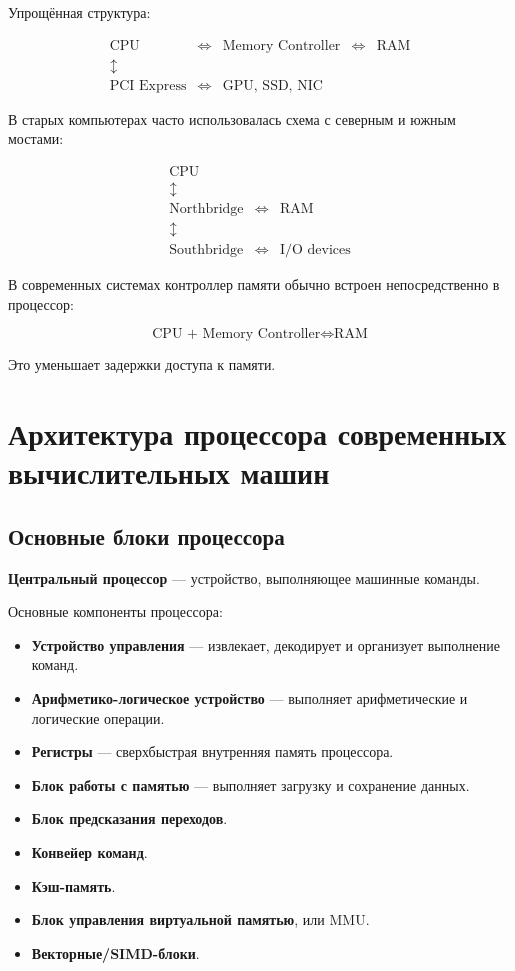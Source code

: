 \documentclass[12pt,a4paper]{article}
\theoremstyle{remark}
\begin{document}
Упрощённая структура:

\[
\begin{array}{ccccc}
\boxed{\text{CPU}}
& \Longleftrightarrow &
\boxed{\text{Memory Controller}}
& \Longleftrightarrow &
\boxed{\text{RAM}}
\\[1em]
\updownarrow & & & & \\
\boxed{\text{PCI Express}}
& \Longleftrightarrow &
\boxed{\text{GPU, SSD, NIC}}
& &
\end{array}
\]

В старых компьютерах часто использовалась схема с северным и южным мостами:

\[
\begin{array}{ccccc}
 & \boxed{\text{CPU}} & & & \\
 & \updownarrow & & & \\
 & \boxed{\text{Northbridge}} & \Longleftrightarrow & \boxed{\text{RAM}} & \\
 & \updownarrow & & & \\
 & \boxed{\text{Southbridge}} & \Longleftrightarrow & \boxed{\text{I/O devices}} &
\end{array}
\]

В современных системах контроллер памяти обычно встроен непосредственно в процессор:

\[
\boxed{\text{CPU + Memory Controller}}
\Longleftrightarrow
\boxed{\text{RAM}}
\]

Это уменьшает задержки доступа к памяти.

\section{Архитектура процессора современных вычислительных машин}

\subsection{Основные блоки процессора}

\textbf{Центральный процессор} --- устройство, выполняющее машинные команды.

Основные компоненты процессора:

\begin{itemize}
    \item \textbf{Устройство управления} --- извлекает, декодирует и организует выполнение команд.
    \item \textbf{Арифметико-логическое устройство} --- выполняет арифметические и логические операции.
    \item \textbf{Регистры} --- сверхбыстрая внутренняя память процессора.
    \item \textbf{Блок работы с памятью} --- выполняет загрузку и сохранение данных.
    \item \textbf{Блок предсказания переходов}.
    \item \textbf{Конвейер команд}.
    \item \textbf{Кэш-память}.
    \item \textbf{Блок управления виртуальной памятью}, или MMU.
    \item \textbf{Векторные/SIMD-блоки}.
\end{itemize}
\end{document}
